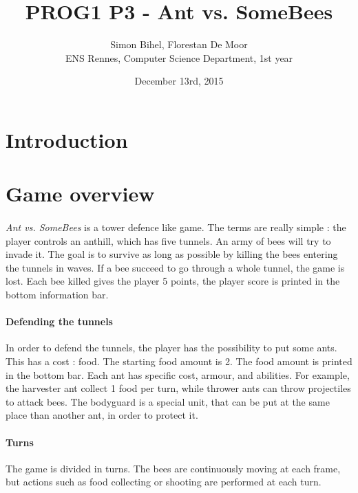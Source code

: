 \documentclass[a4paper]{article}
\begin{document}
\title{PROG1 P3 - Ant vs. SomeBees}
\author{Simon Bihel, Florestan De Moor \\ ENS Rennes, Computer Science Department, 1st year}
\date{December 13rd, 2015}

\newcommand{\this}{\emph{Ant vs. SomeBees }}

\maketitle

\section*{Introduction}


\section{Game overview}

\paragraph{} \this is a tower defence like game. The terms are really simple : the player controls an anthill, which has five tunnels. An army of bees will try to invade it. The goal is to survive as long as possible by killing the bees entering the tunnels in waves. If a bee succeed to go through a whole tunnel, the game is lost. Each bee killed gives the player 5 points, the player score is printed in the bottom information bar.

\paragraph{Defending the tunnels} In order to defend the tunnels, the player has the possibility to put some ants. This has a cost : food. The starting food amount is 2. The food amount is printed in the bottom bar. Each ant has specific cost, armour, and abilities. For example, the harvester ant collect 1 food per turn, while thrower ants can throw projectiles to attack bees. The bodyguard is a special unit, that can be put at the same place than another ant, in order to protect it.

\paragraph{Turns} The game is divided in turns. The bees are continuously moving at each frame, but actions such as food collecting or shooting are performed at each turn.
\end{document}
